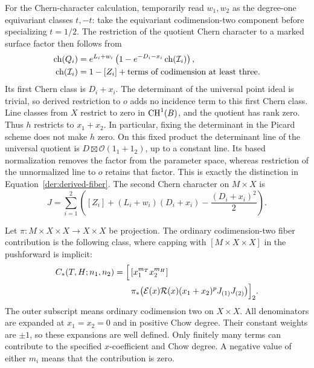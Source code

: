 For the Chern-character calculation, temporarily read $w_1,w_2$ as the
degree-one equivariant classes $t,-t$: take the equivariant
codimension-two component before specializing $t=1/2$.
The restriction of the quotient Chern character to a marked surface
factor then follows from
\[
 \begin{aligned}
 \operatorname{ch}(Q_i)&=e^{L_i+w_i}
 \left(1-e^{-D_i-x_i}\operatorname{ch}(\mathcal I_i)\right),\\
 \operatorname{ch}(\mathcal I_i)
 &=1-[Z_i]+\text{terms of codimension at least three}.
 \end{aligned}
\]
Its first Chern class is $D_i+x_i$.  The determinant of the universal
point ideal is trivial, so derived restriction to $o$ adds no incidence
term to this first Chern class.  Line classes from $X$ restrict to zero
in $\operatorname{CH}^1(B)$, and the quotient has rank zero.  Thus $h$ restricts to
$x_1+x_2$.  In particular, fixing the determinant in the Picard scheme
does not make $h$ zero.  On this fixed product the determinant line of
the universal quotient is
$D\boxtimes\mathcal O(1_1+1_2)$, up to a constant line.
Its based normalization removes the factor from the parameter space,
whereas restriction of the unnormalized line to $o$ retains that factor.
This is exactly the distinction in Equation~\eqref{der:derived-fiber}.
The second Chern character on $M\times X$ is
\begin{equation}
 J=\sum_{i=1}^2
 \left([Z_i]+(L_i+w_i)(D_i+x_i)-\frac{(D_i+x_i)^2}{2}\right).
 \label{eq:insertion}
\end{equation}

Let $\pi:M\times X\times X\to X\times X$ be projection.  The
ordinary codimension-two fiber contribution is the following class,
where capping with $[M\times X\times X]$ in the pushforward is implicit:
\begin{equation}
 \begin{split}
 C_*(T,H;n_1,n_2)
 &=\Bigl[\,[x_1^{m_T}x_2^{m_H}]\\
 &\qquad\pi_*\bigl(\mathcal E(x)\mathcal R(x)(x_1+x_2)^p
 J_{(1)}J_{(2)}\bigr)\Bigr]_2.
 \end{split}
 \label{rel:fiber-contribution}
\end{equation}
The outer subscript means ordinary codimension two on $X\times X$.
All denominators are expanded at $x_1=x_2=0$ and in positive Chow
degree.  Their constant weights are $\pm1$, so these expansions are
well defined.  Only finitely many terms can contribute to the specified
$x$-coefficient and Chow degree.  A negative value of either $m_i$ means
that the contribution is zero.

